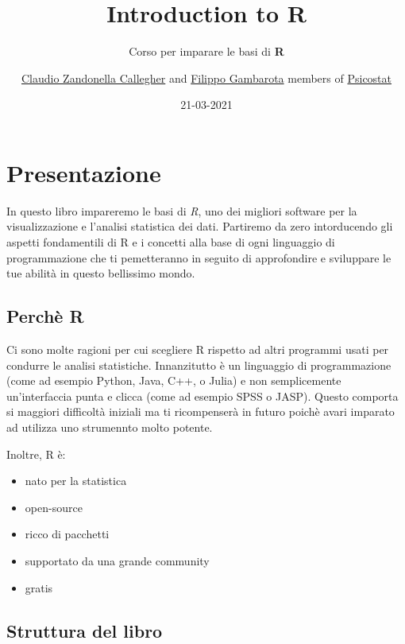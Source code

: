 \documentclass[
]{book}
\title{{Introduction to R}}
\subtitle{Corso per imparare le basi di \textbf{R}}
\author{\href{https://claudiozandonella.netlify.app/}{Claudio Zandonella Callegher} and \href{https://filippogambarota.netlify.app/}{Filippo Gambarota} members of \href{https://psicostat.dpss.psy.unipd.it/}{Psicostat}}
\date{21-03-2021}
\providecommand{\tightlist}{%
  \setlength{\itemsep}{0pt}\setlength{\parskip}{0pt}}
\begin{document}
\maketitle

{
\setcounter{tocdepth}{1}
\tableofcontents
}
\hypertarget{presentazione}{%
\chapter*{Presentazione}\label{presentazione}}

In questo libro impareremo le basi di \emph{R}, uno dei migliori software per la visualizzazione e l'analisi statistica dei dati. Partiremo da zero intorducendo gli aspetti fondamentili di R e i concetti alla base di ogni linguaggio di programmazione che ti pemetteranno in seguito di approfondire e sviluppare le tue abilità in questo bellissimo mondo.

\hypertarget{perchuxe8-r}{%
\section*{Perchè R}\label{perchuxe8-r}}

Ci sono molte ragioni per cui scegliere R rispetto ad altri programmi usati per condurre le analisi statistiche. Innanzitutto è un linguaggio di programmazione (come ad esempio Python, Java, C++, o Julia) e non semplicemente un'interfaccia punta e clicca (come ad esempio SPSS o JASP). Questo comporta si maggiori difficoltà iniziali ma ti ricompenserà in futuro poichè avari imparato ad utilizza uno strumennto molto potente.

Inoltre, R è:

\begin{itemize}
\tightlist
\item
  nato per la statistica
\item
  open-source
\item
  ricco di pacchetti
\item
  supportato da una grande community
\item
  gratis
\end{itemize}

\hypertarget{struttura-del-libro}{%
\section*{Struttura del libro}\label{struttura-del-libro}}
\end{document}

